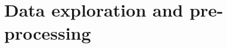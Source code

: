 \newpage\section{Data exploration and pre-processing} \label{section: Data exploration and pre-processing}
\hrulefill  %
